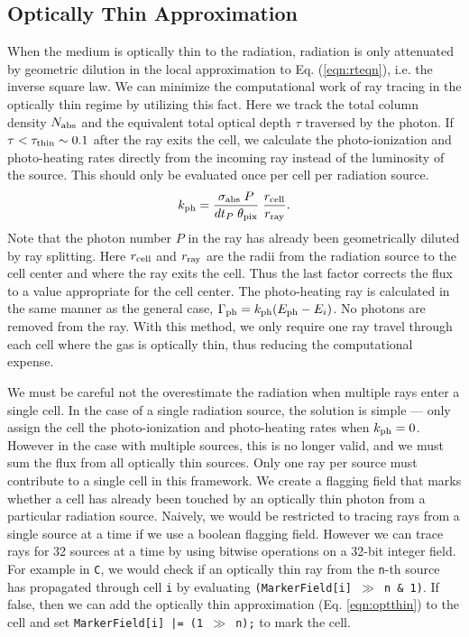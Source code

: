 \documentclass[apj,onecolumn]{emulateapj}
\begin{document}
\subsection{Optically Thin Approximation}

When the medium is optically thin to the radiation, radiation is only
attenuated by geometric dilution in the local approximation to
Eq. (\ref{eqn:rteqn}), i.e. the inverse square law.  We can minimize
the computational work of ray tracing in the optically thin regime by
utilizing this fact.  Here we track the total column density $N_{\rm
  abs}$ and the equivalent total optical depth $\tau$ traversed by the
photon.  If $\tau < \tau_{\rm thin} \sim 0.1$ after the ray exits the
cell, we calculate the photo-ionization and photo-heating rates
directly from the incoming ray instead of the luminosity of the
source.  This should only be evaluated once per cell per radiation
source.
\begin{equation}
  \label{eqn:optthin}
  k_{\rm ph} = \frac{\sigma_{\rm abs} \; P}{dt_P \; \theta_{\rm pix}}
  \; \frac{r_{\rm cell}}{r_{\rm ray}}.
\end{equation}
Note that the photon number $P$ in the ray has already been
geometrically diluted by ray splitting.  Here $r_{\rm cell}$ and
$r_{\rm ray}$ are the radii from the radiation source to the cell
center and where the ray exits the cell.  Thus the last factor
corrects the flux to a value appropriate for the cell center.  The
photo-heating ray is calculated in the same manner as the general
case, $\Gamma_{\rm ph} = k_{\rm ph} (E_{\rm ph} - E_i)$.  No photons
are removed from the ray.  With this method, we only require one ray
travel through each cell where the gas is optically thin, thus
reducing the computational expense.

We must be careful not the overestimate the radiation when multiple
rays enter a single cell.  In the case of a single radiation source,
the solution is simple --- only assign the cell the photo-ionization
and photo-heating rates when $k_{\rm ph} = 0$.  However in the case
with multiple sources, this is no longer valid, and we must sum the
flux from all optically thin sources.  Only one ray per source must
contribute to a single cell in this framework.  We create a flagging
field that marks whether a cell has already been touched by an
optically thin photon from a particular radiation source.  Naively, we
would be restricted to tracing rays from a single source at a time if
we use a boolean flagging field.  However we can trace rays for 32
sources at a time by using bitwise operations on a 32-bit integer
field.  For example in \texttt{C}, we would check if an optically thin
ray from the \texttt{n}-th source has propagated through cell
\texttt{i} by evaluating \texttt{(MarkerField[i] $\gg$ n \& 1)}.  If
false, then we can add the optically thin approximation
(Eq. \ref{eqn:optthin}) to the cell and set \texttt{MarkerField[i] |=
  (1 $\gg$ n);} to mark the cell.
\end{document}
